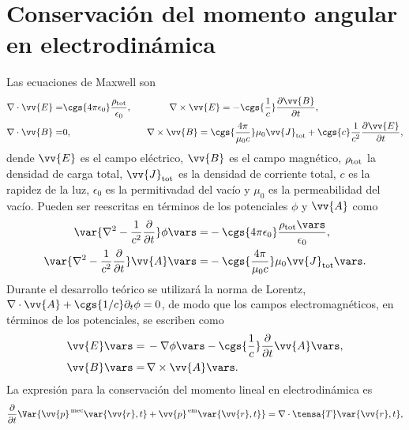 \section{Conservación del momento angular en electrodinámica}
Las ecuaciones de Maxwell son \cite{jackson}
\begin{align}
\nabla\cdot\vv{E} =& \cgs{4\pi\epsilon_0}\frac{\rho_{\text{tot}}}{\epsilon_0}, \qquad \qquad \nabla\times\vv{E}=-\cgs{\frac{1}{c}}\frac{\partial\vv{B}}{\partial t}, \nonumber \\
\nabla\cdot\vv{B} =& 0, \qquad \qquad \qquad \qquad \nabla\times\vv{B}=\cgs{\frac{4\pi}{\mu_0 c}}\mu_0\vv{J}_{\text{tot}}+\cgs{c}\frac{1}{c^2}\frac{\partial\vv{E}}{\partial t},
\label{eq: Maxwell equations}
\end{align}
dende $\vv{E}$ es el campo eléctrico, $\vv{B}$ es el campo magnético, $\rho_{\rm tot}$ la densidad de carga total, $\vv{J}_{\rm tot}$ es la densidad de corriente total, $c$ es la rapidez de la luz, $\epsilon_0$ es la permitivadad del vacío y $\mu_0$ es la permeabilidad del vacío. Pueden ser reescritas en términos de los potenciales $\phi$ y $\vv{A}$ como \cite{jackson}
\begin{align}
\var{\nabla^2 -\frac{1}{c^2}\frac{\partial}{\partial t}}\phi\vars =& - \cgs{4\pi\epsilon_0} \frac{\rho_{\text{tot}}\vars}{\epsilon_0}, \label{eq: scalar potential}\\
\var{\nabla^2 -\frac{1}{c^2}\frac{\partial}{\partial t}}\vv{A}\vars =& - \cgs{\frac{4\pi}{\mu_0 c}}\mu_0 \vv{J}_{\text{tot}}\vars.\label{eq: vector potential}
\end{align}
Durante el desarrollo teórico se utilizará la norma de Lorentz,  $\nabla\cdot\vv{A}+\cgs{1/c}\partial_t \phi =0$, de modo que los campos electromagnéticos, en términos de los potenciales, se escriben como
\begin{align}
\vv{E}\vars =& \, -\nabla\phi\vars - \cgs{\frac{1}{c}}\frac{\partial}{\partial t}\vv{A}\vars, \label{eq: E field potentials}\\
\vv{B}\vars =& \, \nabla\times\vv{A}\vars. \label{eq: B field potentials}
\end{align}
La expresión para la conservación del momento lineal en electrodinámica es \cite{jackson}
\begin{equation}
\frac{\partial}{\partial t} \Var{\vv{p}^{\rm \, mec}\var{\vv{r},t}+\vv{p}^{\rm \, em}\var{\vv{r},t}} = \nabla \cdot \tensa{T}\var{\vv{r},t},
\label{eq: cons momento lineal}
\end{equation}
